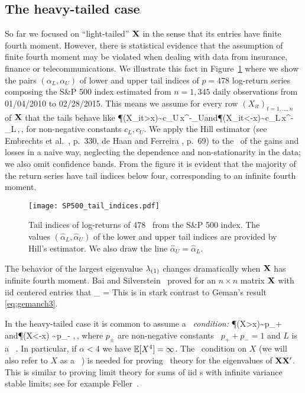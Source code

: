 \subsection{The heavy-tailed case}\label{subsec:1.2}
So far we focused on ``light-tailed'' ${\mathbf X}$
in the sense that its entries have finite fourth moment.  However, there is statistical evidence that the assumption
of finite fourth moment may be violated when dealing with data from
insurance, finance or telecommunications. We illustrate this fact
in Figure~\ref{fig:SP500_tail_indices} where we show the pairs $(\alpha_L,\alpha_U)$ of
lower and upper tail indices
of $p=478$  log-return series composing
the S\&P 500 index estimated from $n=1,345$ daily observations from 01/04/2010 to 02/28/2015.
This means we assume for every row  $(X_{it})_{t=1,\ldots,n}$ of ${\mathbf X}$ that the tails behave like
\beao
\P(X_{it}>x)\sim c_U\,x^{-\alpha_U}\qquad\mbox{and}\qquad \P(X_{it}<-x)\sim c_L\,x^{-\alpha_L}\,,\qquad \xto\,,
\eeao
for non-negative constants $c_L,c_U$. We apply the Hill estimator (see Embrechts et al.~\cite{embrechts:kluppelberg:mikosch:1997}, p.~330,
de Haan and Ferreira \cite{dehaan:ferreira:2006}, p.~69)
to the \ts\ of the gains and losses in a naive way,
neglecting the dependence and non-stationarity in the data; we also omit confidence bands.
From the figure it is evident that the majority of the return series have tail indices below
four, corresponding to an infinite fourth moment.
\begin{figure}[htb!]
\centering
\texttt{[image: SP500\_tail\_indices.pdf]}
\caption{Tail indices of log-returns of 478 \ts\ from the S\&P 500 index. The values  $(\hat \alpha_L,\hat \alpha_U)$ of the
lower and upper tail indices are provided by
Hill's estimator.  We also draw the line $\hat\alpha_U=\hat\alpha_L$.}
\label{fig:SP500_tail_indices}
\end{figure}
The behavior of the largest eigenvalue $\lambda_{(1)}$
changes dramatically when ${\mathbf X}$ has infinite fourth moment.
Bai and Silverstein~\cite{baisilv} proved for an $n\times n$ matrix ${\mathbf X}$ with iid centered entries
that
\beam\label{eq:wdfrch3}
\limsup_{\nto} =\infty {}
\eeam
This is in stark contrast to Geman's result \eqref{eq:gemanch3}.
\par
In the heavy-tailed case it is common to assume a {\em \regvar\ condition:}
\beam\label{eq:regvarch3}
\P(X>x)\sim p_+\,\qquad\mbox{and}\qquad \P(X<-x) \sim p_-\,\,,\qquad \xto\,,
\eeam
where $ p_\pm$ are non-negative constants \sth\ $p_++p_-=1$ and $L$ is a \slvary\ \fct . In particular, if $\alpha<4$ we have $\mathbb{E} [X^4]= \infty$. The \regvar\ condition
on $X$ (we will also refer to $X$ as a \regvary\ \rv ) is needed for proving \asy\ theory for
the eigenvalues of ${\mathbf X}{\mathbf X}'$. This is similar to proving limit theory for sums
of iid \rv s with infinite variance stable limits; see for example Feller~\cite{feller}.
\par

